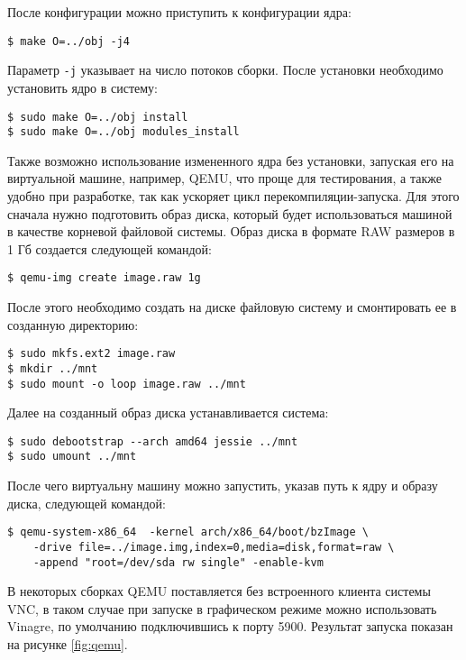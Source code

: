 После конфигурации можно приступить к конфигурации ядра:
\medskip
\begin{lstlisting}[style=cstyle]
$ make O=../obj -j4
\end{lstlisting}
\medskip

Параметр \texttt{-j} указывает на число потоков сборки.
После установки необходимо установить ядро в систему:
\medskip
\begin{lstlisting}[style=cstyle]
$ sudo make O=../obj install
$ sudo make O=../obj modules_install
\end{lstlisting}
\medskip

Также возможно использование измененного ядра без установки, запуская его на
виртуальной машине, например, QEMU, что проще для тестирования, а также удобно
при разработке, так как ускоряет цикл перекомпиляции-запуска. Для этого сначала
нужно подготовить образ диска, который будет использоваться машиной в качестве
корневой файловой системы. Образ диска в формате RAW размеров в 1 Гб создается
следующей командой:
\medskip
\begin{lstlisting}[style=cstyle]
$ qemu-img create image.raw 1g
\end{lstlisting}
\medskip

После этого необходимо создать на диске файловую систему и смонтировать ее в
созданную директорию:
\medskip
\begin{lstlisting}[style=cstyle]
$ sudo mkfs.ext2 image.raw
$ mkdir ../mnt
$ sudo mount -o loop image.raw ../mnt
\end{lstlisting}
\medskip

Далее на созданный образ диска устанавливается система:
\medskip
\begin{lstlisting}[style=cstyle]
$ sudo debootstrap --arch amd64 jessie ../mnt
$ sudo umount ../mnt
\end{lstlisting}
\medskip

После чего виртуальну машину можно запустить, указав путь к ядру и образу диска,
следующей командой:
\medskip
\begin{lstlisting}[style=cstyle]
$ qemu-system-x86_64  -kernel arch/x86_64/boot/bzImage \
    -drive file=../image.img,index=0,media=disk,format=raw \
    -append "root=/dev/sda rw single" -enable-kvm
\end{lstlisting}
\medskip

В некоторых сборках QEMU поставляется без встроенного клиента системы VNC, в
таком случае при запуске в графическом режиме можно использовать Vinagre, по
умолчанию подключившись к порту 5900. Результат запуска показан на рисунке
\ref{fig:qemu}.

